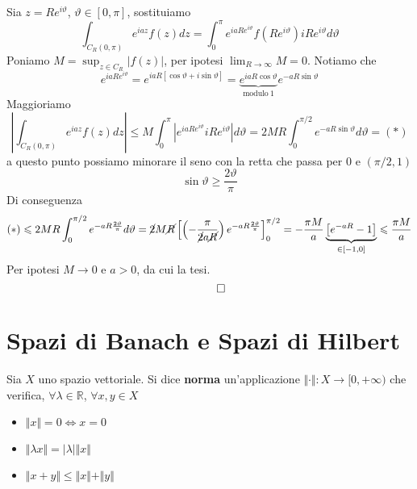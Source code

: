 \documentclass[10pt,a4paper,twoside]{book}
\begin{document}
Sia $z=Re^{i\vartheta }$, $\vartheta \in [ 0,\pi ]$, sostituiamo
\begin{equation*}
\int _{C_{R} (0,\pi )} e^{iaz} f(z)dz=\int ^{\pi }_{0} e^{iaRe^{i\vartheta }} f\left( Re^{i\vartheta }\right) iRe^{i\vartheta } d\vartheta 
\end{equation*}
Poniamo $M=\sup _{z\in C_{R}}| f( z)| $, per ipotesi $\lim _{R\rightarrow \infty } M=0$. Notiamo che
\begin{equation*}
e^{iaRe^{i\vartheta }} =e^{iaR[\cos \vartheta +i\sin \vartheta ]} =\underbrace{e^{iaR\cos \vartheta }}_{\text{modulo} \ 1} e^{-aR\sin \vartheta }
\end{equation*}
Maggioriamo
\begin{equation*}
\left| \int _{C_{R} (0,\pi )} e^{iaz} f(z)dz\right| \leqslant M\int ^{\pi }_{0}\left| e^{iaRe^{i\vartheta }} iRe^{i\vartheta }\right| d\vartheta =2MR\int ^{\pi /2}_{0} e^{-aR\sin \vartheta } d\vartheta =( *)
\end{equation*}
a questo punto possiamo minorare il seno con la retta che passa per $0$ e $( \pi /2,1)$
\begin{equation*}
\sin \vartheta \geqslant \frac{2\vartheta }{\pi }
\end{equation*}
Di conseguenza
\begin{equation*}
( *) \leqslant 2MR\int ^{\pi /2}_{0} e^{-aR\frac{2\vartheta }{\pi }} d\vartheta =\cancel{2} M\cancel{R}\left[\left( -\frac{\pi }{\cancel{2} a\cancel{R}}\right) e^{-aR\frac{2\vartheta }{\pi }}\right]^{\pi /2}_{0} =-\frac{\pi M}{a}\underbrace{\left[ e^{-aR} -1\right]}_{\in [ -1,0]} \leqslant \frac{\pi M}{a}
\end{equation*}
Per ipotesi $M\rightarrow 0$ e $a >0$, da cui la tesi.
\begin{equation*}
\qed 
\end{equation*}



\chapter{Spazi di Banach e Spazi di Hilbert}
\begin{definition}
[Norma] Sia $X$ uno spazio vettoriale. Si dice \textbf{norma} un'applicazione $\Vert \cdotp \Vert :X\rightarrow [ 0,+\infty )$ che verifica, $\forall \lambda \in \mathbb{R}$, $\forall x,y\in X$
\begin{itemize}
\item $\Vert x\Vert =0\Leftrightarrow x=0$
\item $\Vert \lambda x\Vert =| \lambda | \Vert x\Vert $
\item $\Vert x+y\Vert \leqslant \Vert x\Vert +\Vert y\Vert $
\end{itemize}
\end{definition}
\end{document}
